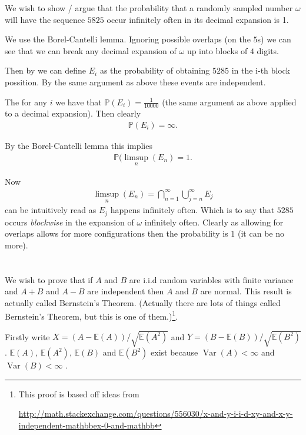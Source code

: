 \documentclass{unswmaths}
\begin{document}
We wish to show / argue that the probability that a randomly sampled number $ \omega $ will have the sequence $ 5825 $ occur infinitely often in its decimal expansion is 1.

We use the Borel-Cantelli lemma. Ignoring possible overlaps (on the $5$s) we can see that we can break any decimal expansion of $ \omega $ up into blocks of $ 4 $ digits. 

Then by we can define $ E_i $ as the probability of obtaining $ 5285 $ in the i-th block possition. By the same argument as above these events are independent.

The for any $ i $ we have that $ \mathbb{P}(E_i) = \frac{1}{10000} $ (the same argument as above applied to a decimal expansion). Then clearly
\begin{align}
  \mathbb{P}( E_i ) = \infty.
\end{align}

By the Borel-Cantelli lemma this implies
\begin{align}
  \mathbb{P}( \limsup_n( E_n ) = 1.
\end{align}

Now 
\begin{align}
  \limsup_n( E_n ) = \bigcap_{n=1}^\infty \bigcup_{j=n}^\infty E_j 
\end{align}
can be intuitively read as $ E_j $ happens infinitely often. Which is to say that $ 5285 $ occurs \emph{blockwise} in the expansion of $ \omega $ infinitely often. Clearly as allowing for overlaps allows for more configurations then the probability is $ 1 $ (it can be no more). 

\section{}
We wish to prove that if $ A $ and $ B $ are i.i.d random variables with finite variance and $ A+B $ and $ A-B $ are independent then $ A $ and $ B $ are normal. This result is actually called Bernstein's Theorem. (Actually there are lots of things called Bernstein's Theorem, but this is one of them.)\footnote{This proof is based off ideas from 

\url{http://math.stackexchange.com/questions/556030/x-and-y-i-i-d-xy-and-x-y-independent-mathbbex-0-and-mathbb}}.

Firstly write $ X = (A - \mathbb{E}(A))/\sqrt{\mathbb{E}(A^2)} $ and $ Y = (B - \mathbb{E}(B))/\sqrt{\mathbb{E}(B^2)} $. $ \mathbb{E}(A) $, $ \mathbb{E}(A^2) $, $\mathbb{E}(B) $ and $\mathbb{E}(B^2) $  exist because $ \operatorname{Var}(A) < \infty $ and $ \operatorname{Var}(B) < \infty $ .
\end{document}
